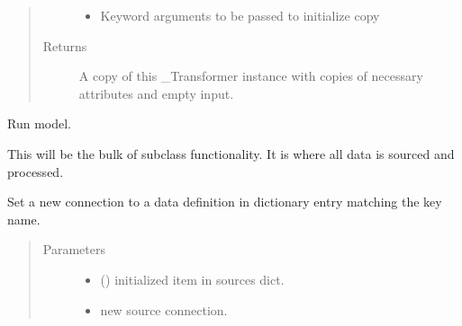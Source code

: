 \documentclass[letterpaper,10pt,english]{sphinxmanual}
\begin{document}
\begin{fulllineitems}
\begin{fulllineitems}
\begin{quote}
\begin{description}
\begin{itemize}
\item {} 
 \textendash{} Keyword arguments to be passed to initialize copy

\end{itemize}

\item[{Returns}] \leavevmode
A copy of this \_Transformer instance with copies of necessary
attributes and empty input.

\end{description}\end{quote}

\end{fulllineitems}


\begin{fulllineitems}
\label{\detokenize{dalio.model:dalio.model.model.Model.run}}
Run model.

This will be the bulk of subclass functionality. It is where all
data is sourced and processed.

\end{fulllineitems}


\begin{fulllineitems}
\label{\detokenize{dalio.model:dalio.model.model.Model.set_input}}
Set a new connection to a data definition in dictionary entry
matching the key name.
\begin{quote}\begin{description}
\item[{Parameters}] \leavevmode\begin{itemize}
\item {} 
 () \textendash{} initialized item in sources dict.

\item {} 
 \textendash{} new source connection.

\end{itemize}


\end{description}
\end{quote}
\end{fulllineitems}
\end{fulllineitems}
\end{document}

